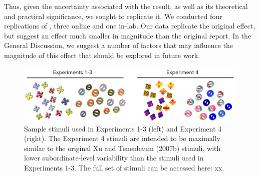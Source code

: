 \documentclass[man]{apa2}
\begin{document}
Thus, given the uncertainty associated with  the  result, as well as its theoretical and practical significance, we sought to replicate it.  We conducted four replications of , three online and one in-lab.  Our data replicate the original effect, but suggest an effect much smaller in magnitude than the original report. In the General Discussion, we suggest a number of factors that may influence the magnitude of this effect that should be explored in future work.





\begin{figure}[t]
 \begin{center} 
  \includegraphics[width=5.8in]{figures/stims.png} 
  \caption{ \label{fig:stims} Sample stimuli used in Experiments 1-3 (left) and Experiment 4 (right). The Experiment 4 stimuli are intended to be maximally similar to the original Xu and Tenenbaum (2007b) stimuli, with lower subordinate-level variability than the stimuli used in Experiments 1-3. The full set of stimuli can be accessed here: xx. 
 } 
 \end{center} 
\end{figure}	
\end{document}
